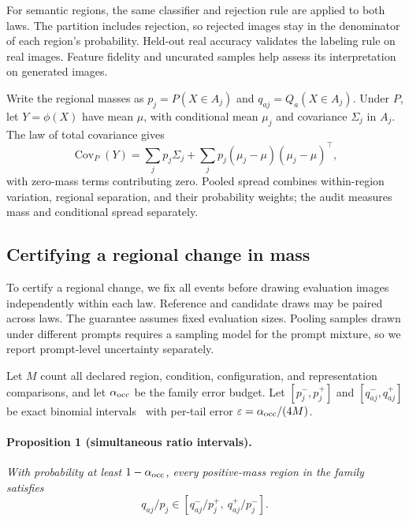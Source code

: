 For semantic regions, the same classifier and rejection rule are applied
to both laws. The partition includes rejection, so rejected images stay
in the denominator of each region's probability. Held-out real accuracy
validates the labeling rule on real images. Feature fidelity and
uncurated samples help assess its interpretation on generated images.

Write the regional masses as $p_j=P(X\in A_j)$ and
$q_{aj}=Q_a(X\in A_j)$. Under $P$, let $Y=\phi(X)$ have mean $\mu$,
with conditional mean $\mu_j$ and covariance $\Sigma_j$ in $A_j$.
The law of total covariance gives
\begin{equation}
\operatorname{Cov}_{P}(Y)
=\sum_j p_j\Sigma_j+\sum_j p_j(\mu_j-\mu)(\mu_j-\mu)^\top,
\label{eq:totalcov}
\end{equation}
with zero-mass terms contributing zero. Pooled spread combines
within-region variation, regional separation, and their probability
weights; the audit measures mass and conditional spread separately.

\subsection{Certifying a regional change in mass}
\label{sec:mass}
To certify a regional change, we fix all events before drawing evaluation
images independently within each law. Reference and candidate draws may
be paired across laws. The guarantee assumes fixed evaluation sizes.
Pooling samples drawn under different prompts requires a sampling model
for the prompt mixture, so we report prompt-level uncertainty separately.

Let $M$ count all declared region, condition, configuration, and
representation comparisons, and let $\alpha_{\rm occ}$ be the family
error budget. Let $[p_j^-,p_j^+]$ and $[q_{aj}^-,q_{aj}^+]$ be exact
binomial intervals~\cite{clopper1934confidence} with per-tail error
$\varepsilon=\alpha_{\rm occ}/(4M)$.

\paragraph{Proposition 1 (simultaneous ratio intervals).}
\emph{With probability at least $1-\alpha_{\rm occ}$, every positive-mass
region in the family satisfies}
\begin{equation}
q_{aj}/p_j\in\left[q_{aj}^-/p_j^+,\ q_{aj}^+/p_j^-\right].
\label{eq:occupancy}
\end{equation}

